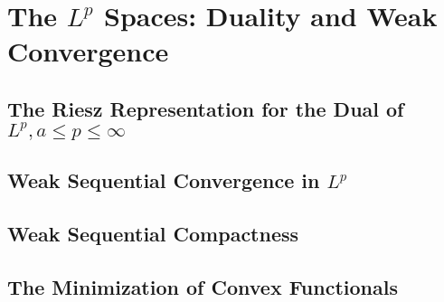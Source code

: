 \chapter{The $L^p$ Spaces: Duality and Weak Convergence}

\section{The Riesz Representation for the Dual of $L^p,a\le p\le \infty$}
\section{Weak Sequential Convergence in $L^p$}
\section{Weak Sequential Compactness}
\section{The Minimization of Convex Functionals}
